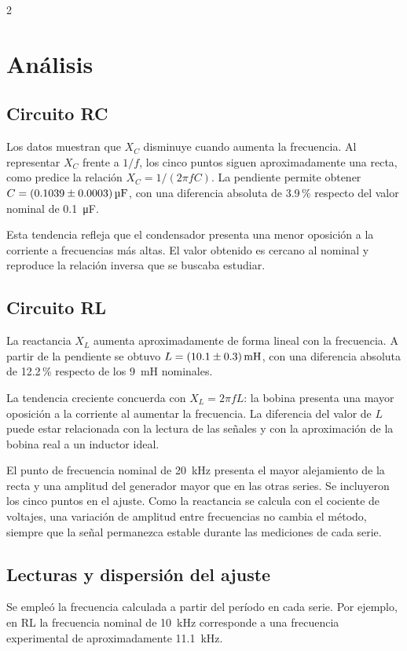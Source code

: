 \documentclass[10pt,letterpaper]{article}
\begin{document}



\clearpage
\begin{multicols}{2}\raggedcolumns
\section{Análisis}
\subsection{Circuito RC}
Los datos muestran que $X_C$ disminuye cuando aumenta la frecuencia. Al representar $X_C$ frente a $1/f$, los cinco puntos siguen aproximadamente una recta, como predice la relación $X_C=1/(2\pi fC)$. La pendiente permite obtener $C=(\num{0.1039}\pm\num{0.0003})\,\si{\micro\farad}$, con una diferencia absoluta de \num{3.9}\,\% respecto del valor nominal de \SI{0.1}{\micro\farad}.

Esta tendencia refleja que el condensador presenta una menor oposición a la corriente a frecuencias más altas. El valor obtenido es cercano al nominal y reproduce la relación inversa que se buscaba estudiar.

\subsection{Circuito RL}
La reactancia $X_L$ aumenta aproximadamente de forma lineal con la frecuencia. A partir de la pendiente se obtuvo $L=(\ResultadoL)\,\si{\milli\henry}$, con una diferencia absoluta de \num{12.2}\,\% respecto de los \SI{9}{\milli\henry} nominales.

La tendencia creciente concuerda con $X_L=2\pi fL$: la bobina presenta una mayor oposición a la corriente al aumentar la frecuencia. La diferencia del valor de $L$ puede estar relacionada con la lectura de las señales y con la aproximación de la bobina real a un inductor ideal.

El punto de frecuencia nominal de \SI{20}{\kilo\hertz} presenta el mayor alejamiento de la recta y una amplitud del generador mayor que en las otras series. Se incluyeron los cinco puntos en el ajuste. Como la reactancia se calcula con el cociente de voltajes, una variación de amplitud entre frecuencias no cambia el método, siempre que la señal permanezca estable durante las mediciones de cada serie.

\columnbreak
\subsection{Lecturas y dispersión del ajuste}
Se empleó la frecuencia calculada a partir del período en cada serie. Por ejemplo, en RL la frecuencia nominal de \SI{10}{\kilo\hertz} corresponde a una frecuencia experimental de aproximadamente \SI{11.1}{\kilo\hertz}.


\end{multicols}
\end{document}
